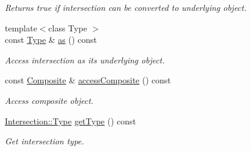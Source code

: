 \begin{DoxyCompactItemize}
$$\begin{DoxyCompactList}\small\item\em Returns true if intersection can be converted to underlying object. \end{DoxyCompactList}\item 
{\footnotesize template$<$class Type $>$ }\\const \hyperlink{classostk_1_1math_1_1geom_1_1d3_1_1_intersection_a21196aae3f56795cb11d07afaaaf41c1}{Type} \& \hyperlink{classostk_1_1math_1_1geom_1_1d3_1_1_intersection_a4be3a53127df9940bc2eb61777b22b33}{as} () const
\begin{DoxyCompactList}\small\item\em Access intersection as its underlying object. \end{DoxyCompactList}\item 
const \hyperlink{classostk_1_1math_1_1geom_1_1d3_1_1objects_1_1_composite}{Composite} \& \hyperlink{classostk_1_1math_1_1geom_1_1d3_1_1_intersection_a1de691632d78ffb4304bbddf6fd65ed6}{access\+Composite} () const
\begin{DoxyCompactList}\small\item\em Access composite object. \end{DoxyCompactList}\item 
\hyperlink{classostk_1_1math_1_1geom_1_1d3_1_1_intersection_a21196aae3f56795cb11d07afaaaf41c1}{Intersection\+::\+Type} \hyperlink{classostk_1_1math_1_1geom_1_1d3_1_1_intersection_a3c3d6c3c38113ddb2bf6508045f3aca3}{get\+Type} () const
\begin{DoxyCompactList}\small\item\em Get intersection type. \end{DoxyCompactList}\end{DoxyCompactItemize}
